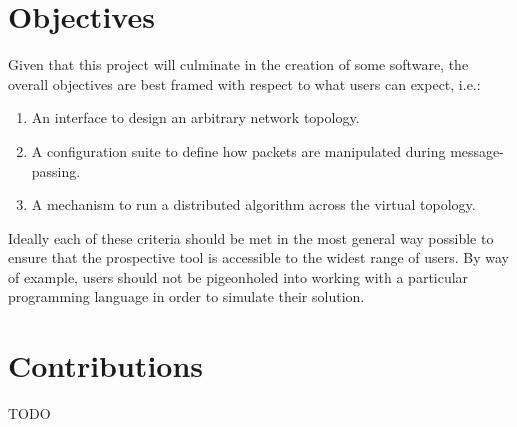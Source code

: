 \section{Objectives}

Given that this project will culminate in the creation of some software, the overall objectives are best framed with
respect to what users can expect, i.e.:
\begin{enumerate}
    \item An interface to design an arbitrary network topology.
    \item A configuration suite to define how packets are manipulated during message-passing.
    \item A mechanism to run a distributed algorithm across the virtual topology.
\end{enumerate}

Ideally each of these criteria should be met in the most general way possible to ensure that the prospective tool is
accessible to the widest range of users. By way of example, users should not be pigeonholed into working with a
particular programming language in order to simulate their solution.


\section{Contributions}

TODO
